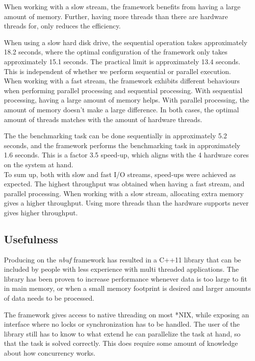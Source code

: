 \documentclass[a4paper]{article}
\newcommand{\nbuf}{\textit{nbuf} }
\begin{document}
When working with a slow stream, the framework benefits from having a large amount of memory. Further, having more threads than there are hardware threads for, only reduces the efficiency. 

When using a slow hard disk drive, the sequential operation takes approximately 18.2 seconds, where the optimal configuration of the framework only takes approximately 15.1 seconds. The practical limit is approximately 13.4 seconds. This is independent of whether we perform sequential or parallel execution.\\

When working with a fast stream, the framework exhibits different behaviours when performing parallel processing and sequential processing. With sequential processing, having a large amount of memory helps. With parallel processing, the amount of memory doesn't make a large difference. In both cases, the optimal amount of threads matches with the amount of hardware threads. 

The the benchmarking task can be done sequentially in approximately 5.2 seconds, and the framework performs the benchmarking task in approximately 1.6 seconds. This is a factor 3.5 speed-up, which aligns with the 4 hardware cores on the system at hand.\\

To sum up, both with slow and fast I/O streams, speed-ups were achieved as expected. The highest throughput was obtained when having a fast stream, and parallel processing. When working with a slow stream, allocating extra memory gives a higher throughput. Using more threads than the hardware supports never gives higher throughput.


\subsection{Usefulness}
Producing on the \nbuf framework has resulted in a C++11 library that can be included by people with less experience with multi threaded applications. The library has been proven to increase performance whenever data is too large to fit in main memory, or when a small memory footprint is desired and larger amounts of data needs to be processed.

The framework gives access to native threading on most *NIX, while exposing an interface where no locks or synchronization has to be handled. The user of the library still has to know to what extend he can parallelize the task at hand, so that the task is solved correctly. This does require some amount of knowledge about how concurrency works.\\
\end{document}
